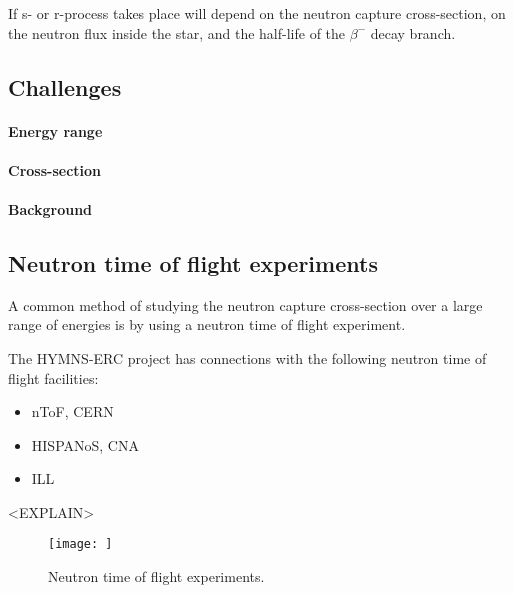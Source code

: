 If s- or r-process takes place will depend on the neutron capture cross-section, on the neutron flux inside the star, and the half-life of the $\beta^-$ decay branch.

\subsection{Challenges}

\paragraph*{Energy range}


\paragraph*{Cross-section}


\paragraph*{Background}

\subsection{Neutron time of flight experiments}

A common method of studying the neutron capture cross-section over a large range of energies is by using a neutron time of flight experiment.

The \ac{HYMNS}-\ac{ERC} project has connections with the following neutron time of flight facilities:
\begin{itemize}
    \item \ac{nToF}, \ac{CERN}
    \item \ac{HISPANoS}, \ac{CNA}
    \item \ac{ILL}
\end{itemize}

<EXPLAIN>

\begin{figure}[h!]
    \centering
    \texttt{[image: ]}%
    \caption{Neutron time of flight experiments.}%
    \label{fig:ntof}%
\end{figure}

